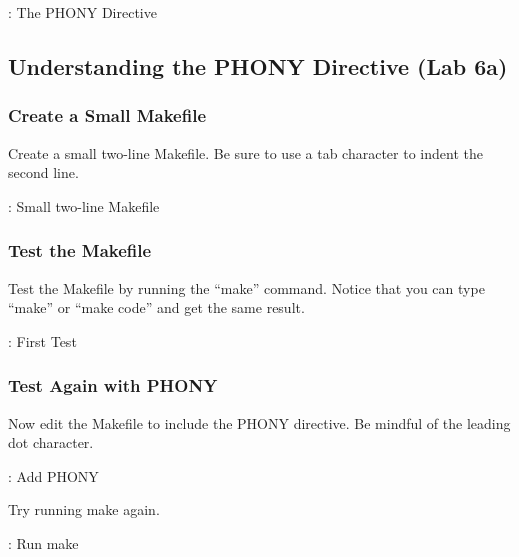 \justify{}
\begin{mybox}{\thetcbcounter: The PHONY Directive}
	
\end{mybox}

\subsection{Understanding the PHONY Directive (Lab 6a)}

\subsubsection{Create a Small Makefile}
\justify{}
Create a small two-line Makefile. Be sure to use a tab character to indent the second line.

\begin{mybox}{\thetcbcounter: Small two-line Makefile}
	
\end{mybox}

\subsubsection{Test the Makefile}

\justify{}
Test the Makefile by running the ``make'' command. Notice that you can
type ``make'' or ``make code'' and get the same result.

\begin{mybox}{\thetcbcounter: First Test}
	
\end{mybox}

\subsubsection{Test Again with PHONY}

\justify{}
Now edit the Makefile to include the PHONY directive. Be mindful of the 
leading dot character.

\begin{mybox}{\thetcbcounter: Add PHONY}
	
\end{mybox}

\justify{}
Try running make again.

\begin{mybox}{\thetcbcounter: Run make}
	
\end{mybox}

